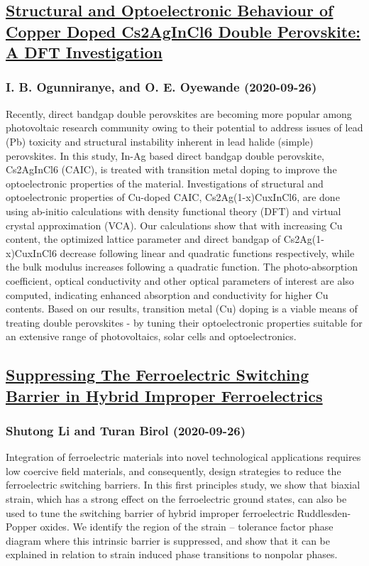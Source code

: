 \subsection*{\href{http://arxiv.org/abs/2009.12490v1}{Structural and Optoelectronic Behaviour of Copper Doped Cs2AgInCl6  Double Perovskite: A DFT Investigation}}
\subsubsection*{I. B. Ogunniranye, and O. E. Oyewande (2020-09-26)}
Recently, direct bandgap double perovskites are becoming more popular among
photovoltaic research community owing to their potential to address issues of
lead (Pb) toxicity and structural instability inherent in lead halide (simple)
perovskites. In this study, In-Ag based direct bandgap double perovskite,
Cs2AgInCl6 (CAIC), is treated with transition metal doping to improve the
optoelectronic properties of the material. Investigations of structural and
optoelectronic properties of Cu-doped CAIC, Cs2Ag(1-x)CuxInCl6, are done using
ab-initio calculations with density functional theory (DFT) and virtual crystal
approximation (VCA). Our calculations show that with increasing Cu content, the
optimized lattice parameter and direct bandgap of Cs2Ag(1-x)CuxInCl6 decrease
following linear and quadratic functions respectively, while the bulk modulus
increases following a quadratic function. The photo-absorption coefficient,
optical conductivity and other optical parameters of interest are also
computed, indicating enhanced absorption and conductivity for higher Cu
contents. Based on our results, transition metal (Cu) doping is a viable means
of treating double perovskites - by tuning their optoelectronic properties
suitable for an extensive range of photovoltaics, solar cells and
optoelectronics.

\subsection*{\href{http://arxiv.org/abs/2009.12486v1}{Suppressing The Ferroelectric Switching Barrier in Hybrid Improper  Ferroelectrics}}
\subsubsection*{Shutong Li and Turan Birol (2020-09-26)}
Integration of ferroelectric materials into novel technological applications
requires low coercive field materials, and consequently, design strategies to
reduce the ferroelectric switching barriers. In this first principles study, we
show that biaxial strain, which has a strong effect on the ferroelectric ground
states, can also be used to tune the switching barrier of hybrid improper
ferroelectric Ruddlesden-Popper oxides. We identify the region of the strain --
tolerance factor phase diagram where this intrinsic barrier is suppressed, and
show that it can be explained in relation to strain induced phase transitions
to nonpolar phases.

